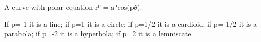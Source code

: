 A curve with polar equation $ \mathrm{r}^{\mathrm{p}} = \mathrm{a}^{\mathrm{p}}
\mathrm{cos(p} \theta ) . $
\par
If p=-1 it is a line; if p=1 it is a circle; if p=1/2 it is a cardioid;
if p=-1/2 it is a parabola; if p=-2 it is a hyperbola; if p=2 it is a lemniscate.